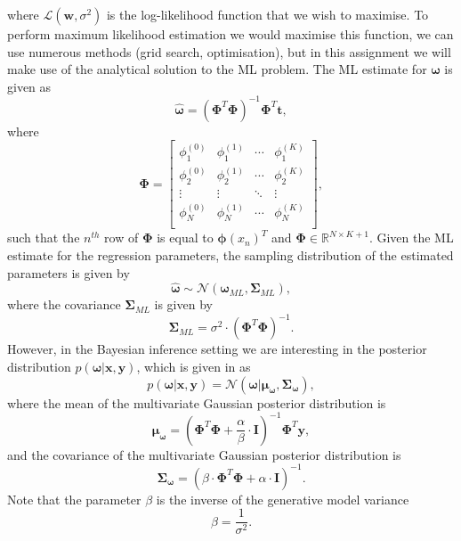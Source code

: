 \documentclass{article}
\begin{document}
where $\mathcal{L}(\mathbf{w}, \sigma^2)$ is the log-likelihood function that we wish to maximise. To perform maximum likelihood estimation  we would maximise this function, we can use numerous methods (grid search, optimisation), but in this assignment we will make use of the analytical solution to the ML problem. The ML estimate for $\boldsymbol\omega$ is given as
\begin{equation}
\hat{\boldsymbol\omega} = \left( \boldsymbol\Phi^T \boldsymbol\Phi \right)^{-1} \boldsymbol\Phi^T \mathbf{t},
\end{equation}
where 
\begin{equation}
\boldsymbol\Phi = 
\begin{bmatrix}
\phi_1^{(0)} & \phi_1^{(1)} & \cdots & \phi_1^{(K)} \\
\phi_2^{(0)} & \phi_2^{(1)} & \cdots & \phi_2^{(K)} \\
\vdots & \vdots & \ddots & \vdots \\
\phi_N^{(0)} & \phi_N^{(1)} & \cdots & \phi_N^{(K)} \\
\end{bmatrix},
\end{equation}
such that the $n^{th}$ row of $\boldsymbol\Phi$ is equal to $\boldsymbol\phi(x_n)^T$ and $\boldsymbol\Phi \in \mathbb{R}^{N \times K + 1}$. Given the ML estimate for the regression parameters, the sampling distribution of the estimated parameters is given by
\begin{equation}
\hat{\boldsymbol\omega} \sim \mathcal{N}(\boldsymbol\omega_{ML}, \boldsymbol\Sigma_{ML}),
\end{equation}
where the covariance $\boldsymbol\Sigma_{ML}$ is given by
\begin{equation}
\boldsymbol\Sigma_{ML} = \sigma^2 \cdot \left(\boldsymbol\Phi^T \boldsymbol\Phi\right)^{-1}.
\end{equation}
However, in the Bayesian inference setting we are interesting in the posterior distribution $p(\boldsymbol\omega \vert \mathbf{x}, \mathbf{y})$, which is given in \citeauthor*{bishop2006} \cite{bishop2006} as
\begin{equation}
p(\boldsymbol\omega \vert \mathbf{x}, \mathbf{y}) = \mathcal{N}\left(\boldsymbol\omega \vert \boldsymbol\mu_{\boldsymbol\omega}, \boldsymbol\Sigma_{\boldsymbol\omega}  \right),
\end{equation}
where the mean of the multivariate Gaussian posterior distribution is
\begin{equation}
\boldsymbol\mu_{\boldsymbol\omega} = \left( \boldsymbol\Phi^T \boldsymbol\Phi + \frac{\alpha}{\beta}\cdot \mathbf{I}  \right)^{-1} \boldsymbol\Phi^T \mathbf{y},
\end{equation}
and the covariance of the multivariate Gaussian posterior distribution is
\begin{equation}
\boldsymbol\Sigma_{\boldsymbol\omega} = \left( \beta \cdot \boldsymbol\Phi^T \boldsymbol\Phi + \alpha \cdot \mathbf{I}  \right)^{-1}.
\end{equation}
Note that the parameter $\beta$ is the inverse of the generative model variance
\begin{equation}
\beta = \frac{1}{\sigma^2}.
\end{equation}
\end{document}
